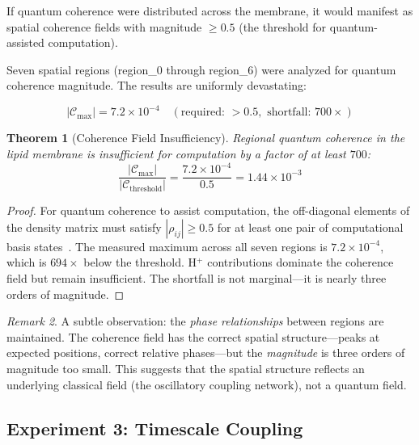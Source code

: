 \documentclass[twocolumn,10pt,a4paper]{article}
\newtheorem{theorem}{Theorem}[section]
\theoremstyle{definition}
\theoremstyle{remark}
\newtheorem{remark}[theorem]{Remark}
\begin{document}
If quantum coherence were distributed across the membrane, it would manifest as spatial coherence fields with magnitude $\geq 0.5$ (the threshold for quantum-assisted computation).

Seven spatial regions (region\_0 through region\_6) were analyzed for quantum coherence magnitude. The results are uniformly devastating:

\begin{equation}
\label{eq:coherence_field}
|\mathcal{C}_{\mathrm{max}}| = 7.2 \times 10^{-4} \quad (\text{required: } > 0.5, \text{ shortfall: } 700\times)
\end{equation}

\begin{theorem}[Coherence Field Insufficiency]
\label{thm:coherence}
Regional quantum coherence in the lipid membrane is insufficient for computation by a factor of at least $700$:
\begin{equation}
\label{eq:coherence_ratio}
\frac{|\mathcal{C}_{\mathrm{max}}|}{|\mathcal{C}_{\mathrm{threshold}}|} = \frac{7.2 \times 10^{-4}}{0.5} = 1.44 \times 10^{-3}
\end{equation}
\end{theorem}

\begin{proof}
For quantum coherence to assist computation, the off-diagonal elements of the density matrix must satisfy $|\rho_{ij}| \geq 0.5$ for at least one pair of computational basis states~\citep{lambert2013quantum}. The measured maximum across all seven regions is $7.2 \times 10^{-4}$, which is $694\times$ below the threshold. H$^+$ contributions dominate the coherence field but remain insufficient. The shortfall is not marginal---it is nearly three orders of magnitude. \qedhere
\end{proof}

\begin{remark}
\label{rem:phase_structure}
A subtle observation: the \emph{phase relationships} between regions are maintained. The coherence field has the correct spatial structure---peaks at expected positions, correct relative phases---but the \emph{magnitude} is three orders of magnitude too small. This suggests that the spatial structure reflects an underlying classical field (the oscillatory coupling network), not a quantum field.
\end{remark}

\subsection{Experiment 3: Timescale Coupling}
\end{document}
